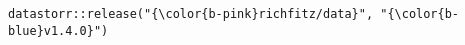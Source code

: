 \documentclass[class=minimal,border=0]{standalone}
\begin{document}
%
\begin{BVerbatim}[bgcolor=b-darkgrey]
datastorr::release("{\color{b-pink}richfitz/data}", "{\color{b-blue}v1.4.0}")
\end{BVerbatim}
\end{document}
